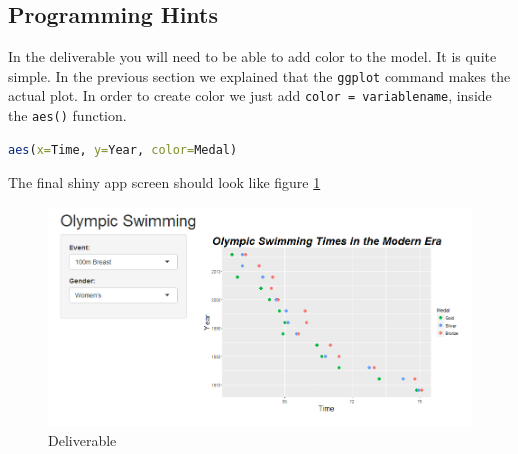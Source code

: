 \subsection{Programming Hints}
In the deliverable you will need to be able to add color to the model.
It is quite simple.
In the previous section we explained that the \texttt{ggplot} command makes the actual plot.
In order to create color we just add \texttt{color = variablename}, inside the \texttt{aes()} function.

\begin{lstlisting}[language = R]
aes(x=Time, y=Year, color=Medal)
\end{lstlisting}
The final shiny app screen should look like figure \ref{fig:olympic}
\begin{figure}[h]
   \centering
   \includegraphics[width = .5\textwidth]{pictures/shiny/olympic.PNG} 
   \caption{Deliverable}
   \label{fig:olympic}
\end{figure}

